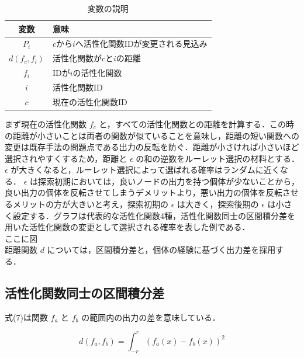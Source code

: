 \begin{table}[h]
    \caption{変数の説明}
    \centering
    \begin{tabular}{cl}
        \hline
        変数  & 意味 \\
        \hline \hline
        $P_{i}$               & $c$から$i$へ活性化関数IDが変更される見込み \\
        $d(f_{c}, f_{i})$     & 活性化関数が$c$と$i$の距離                 \\
        $f_{i}$               & IDが$i$の活性化関数                        \\
        $i$                   & 活性化関数ID                               \\
        $c$                   & 現在の活性化関数ID                         \\
        \hline
    \end{tabular}
\end{table}

まず現在の活性化関数 $ f_c $ と，すべての活性化関数との距離を計算する．この時の距離が小さいことは両者の関数が似ていることを意味し，距離の短い関数への変更は既存手法の問題点である出力の反転を防ぐ．距離が小さければ小さいほど選択されやすくするため，距離と $ \epsilon $ の和の逆数をルーレット選択の材料とする． $ \epsilon $ が大きくなると，ルーレット選択によって選ばれる確率はランダムに近くなる． $ \epsilon $ は探索初期においては，良いノードの出力を持つ個体が少ないことから，良い出力の個体を反転させてしまうデメリットより，悪い出力の個体を反転させるメリットの方が大きいと考え，探索初期の $ \epsilon $ は大きく，探索後期の $ \epsilon $ は小さく設定する．グラフは代表的な活性化関数4種，活性化関数同士の区間積分差を用いた活性化関数の変更として選択される確率を表した例である．\\

ここに図 \\

距離関数 $ d $ については，区間積分差と，個体の経験に基づく出力差を採用する．

\clearpage
\subsection{活性化関数同士の区間積分差}
式(7)は関数 $ f_a $ と $ f_b $ の範囲内の出力の差を意味している．

\begin{equation}
    d(f_{a}, f_{b}) = \int^{r}_{-r} (f_{a}(x) - f_{b}(x))^{2}
\end{equation}

